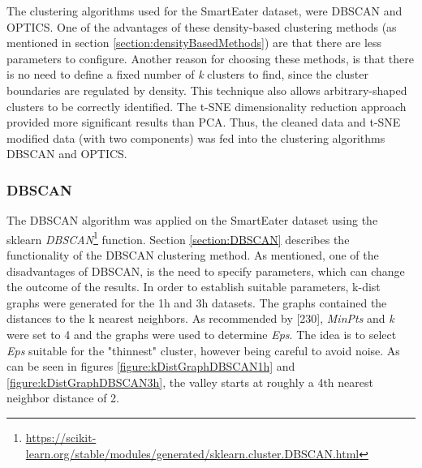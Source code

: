 The clustering algorithms used for the SmartEater dataset, were DBSCAN and OPTICS. One of the advantages of these density-based clustering methods (as mentioned in section \ref{section:densityBasedMethods}) are that there are less parameters to configure. Another reason for choosing these methods, is that there is no need to define a fixed number of \textit{k} clusters to find, since the cluster boundaries are regulated by density. This technique also allows arbitrary-shaped clusters to be correctly identified. The t-SNE dimensionality reduction approach provided more significant results than PCA. Thus, the cleaned data and t-SNE modified data (with two components) was fed into the clustering algorithms DBSCAN and OPTICS.

\subsubsection{DBSCAN}
The DBSCAN algorithm was applied on the SmartEater dataset using the sklearn \textit{DBSCAN}\footnote{\url{https://scikit-learn.org/stable/modules/generated/sklearn.cluster.DBSCAN.html}} function.
Section \ref{section:DBSCAN} describes the functionality of the DBSCAN clustering method. As mentioned, one of the disadvantages of DBSCAN, is the need to specify parameters, which can change the outcome of the results. In order to establish suitable parameters, k-dist graphs were generated for the 1h and 3h datasets. The graphs contained the distances to the k nearest neighbors. As recommended by \textcite{DBSCAN}[230], \textit{MinPts} and \textit{k} were set to 4 and the graphs were used to determine \textit{Eps}. The idea is to select \textit{Eps} suitable for the "thinnest" cluster, however being careful to avoid noise. As can be seen in figures \ref{figure:kDistGraphDBSCAN1h} and \ref{figure:kDistGraphDBSCAN3h}, the valley starts at roughly a 4th nearest neighbor distance of 2. 




